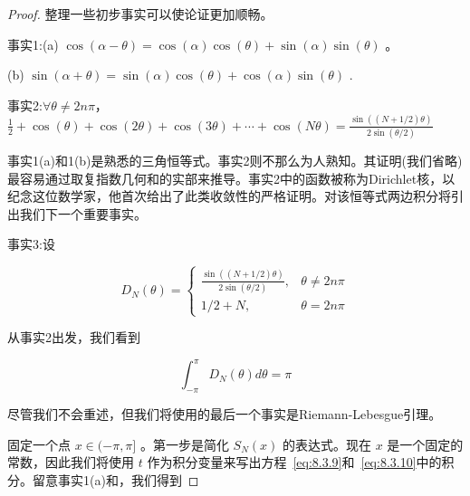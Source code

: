 \begin{proof}
整理一些初步事实可以使论证更加顺畅。

事实1:(a) \(\cos \left( {\alpha  - \theta }\right)  = \cos \left( \alpha \right) \cos \left( \theta \right)  + \sin \left( \alpha \right) \sin \left( \theta \right)\) 。

(b) \(\sin \left( {\alpha  + \theta }\right)  = \sin \left( \alpha \right) \cos \left( \theta \right)  + \cos \left( \alpha \right) \sin \left( \theta \right)\) .

事实2:$\forall \theta\ne 2n\pi$， \(\frac{1}{2} + \cos \left( \theta \right)  + \cos \left( {2\theta }\right)  + \cos \left( {3\theta }\right)  + \cdots  + \cos \left( {N\theta }\right)  = \frac{\sin \left( {\left( {N + 1/2}\right) \theta }\right) }{2\sin \left( {\theta /2}\right) }\)


事实1(a)和1(b)是熟悉的三角恒等式。事实2则不那么为人熟知。其证明(我们省略)最容易通过取复指数几何和的实部来推导。事实2中的函数被称为Dirichlet核，以纪念这位数学家，他首次给出了此类收敛性的严格证明。对该恒等式两边积分将引出我们下一个重要事实。

事实3:设

\[
{D}_{N}\left( \theta \right)  = \left\{  \begin{array}{ll} \frac{\sin \left( {\left( {N + 1/2}\right) \theta }\right) }{2\sin \left( {\theta /2}\right) }, & \theta  \neq  {2n\pi } \\  1/2 + N, & \theta  = {2n\pi } \end{array}\right.
\]

从事实2出发，我们看到

\[
{\int }_{-\pi }^{\pi }{D}_{N}\left( \theta \right) {d\theta } = \pi
\]

尽管我们不会重述，但我们将使用的最后一个事实是Riemann-Lebesgue引理。

固定一个点 \(x \in  ( - \pi ,\pi \rbrack\) 。第一步是简化 \({S}_{N}\left( x\right)\) 的表达式。现在 \(x\) 是一个固定的常数，因此我们将使用 \(t\) 作为积分变量来写出方程~\eqref{eq:8.3.9}和~\eqref{eq:8.3.10}中的积分。留意事实1(a)和，我们得到


\end{proof}
